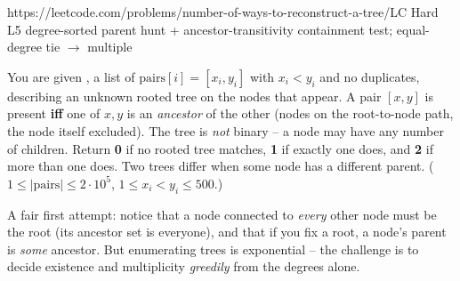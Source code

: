   {https://leetcode.com/problems/number-of-ways-to-reconstruct-a-tree/}{LC Hard L5}
  {degree-sorted parent hunt + ancestor-transitivity containment test; equal-degree tie $\to$ multiple}

\begin{problemstatement}
You are given , a list of $\text{pairs}[i]=[x_i,y_i]$ with $x_i<y_i$ and no duplicates,
describing an unknown rooted tree on the nodes that appear. A pair $[x,y]$ is present \textbf{iff}
one of $x,y$ is an \emph{ancestor} of the other (nodes on the root-to-node path, the node itself
excluded). The tree is \emph{not} binary -- a node may have any number of children. Return
\textbf{0} if no rooted tree matches, \textbf{1} if exactly one does, and \textbf{2} if more than
one does. Two trees differ when some node has a different parent. ($1\le|\text{pairs}|\le2\cdot10^{5}$,
$1\le x_i<y_i\le500$.)
\end{problemstatement}

\begin{attemptgate}
A fair first attempt: notice that a node connected to \emph{every} other node must be the root (its
ancestor set is everyone), and that if you fix a root, a node's parent is \emph{some} ancestor. But
enumerating trees is exponential -- the challenge is to decide existence and multiplicity
\emph{greedily} from the degrees alone.
\end{attemptgate}

